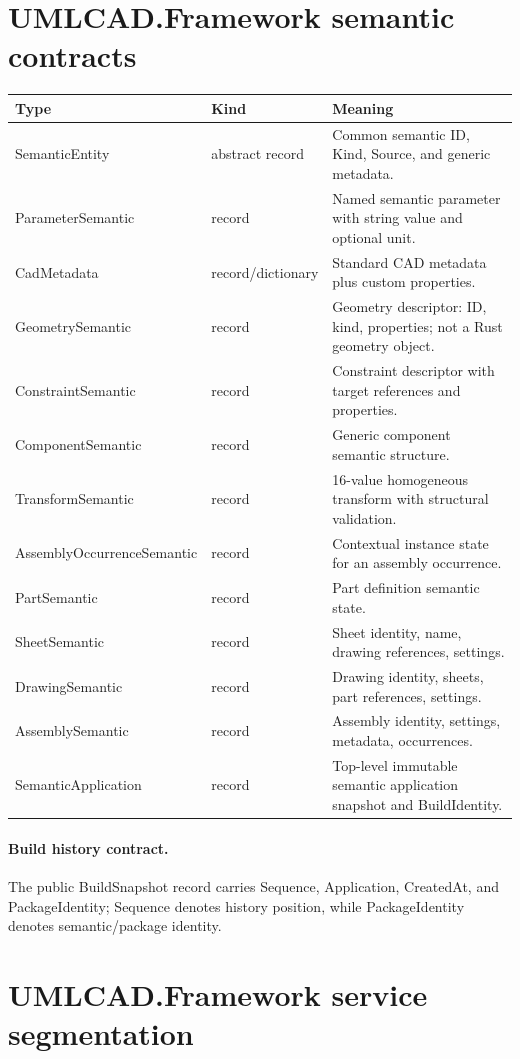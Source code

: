 \documentclass[11pt,a4paper]{report}
\begin{document}
\section{UMLCAD.Framework semantic contracts}

\begin{longtable}{@{}p{}p{}p{}@{}}
\toprule
Type & Kind & Meaning \\
\midrule
SemanticEntity & abstract record & Common semantic ID, Kind, Source, and generic metadata. \\
ParameterSemantic & record & Named semantic parameter with string value and optional unit. \\
CadMetadata & record/dictionary & Standard CAD metadata plus custom properties. \\
GeometrySemantic & record & Geometry descriptor: ID, kind, properties; not a Rust geometry object. \\
ConstraintSemantic & record & Constraint descriptor with target references and properties. \\
ComponentSemantic & record & Generic component semantic structure. \\
TransformSemantic & record & 16-value homogeneous transform with structural validation. \\
AssemblyOccurrenceSemantic & record & Contextual instance state for an assembly occurrence. \\
PartSemantic & record & Part definition semantic state. \\
SheetSemantic & record & Sheet identity, name, drawing references, settings. \\
DrawingSemantic & record & Drawing identity, sheets, part references, settings. \\
AssemblySemantic & record & Assembly identity, settings, metadata, occurrences. \\
SemanticApplication & record & Top-level immutable semantic application snapshot and BuildIdentity. \\
\bottomrule
\end{longtable}

\paragraph{Build history contract.} The public BuildSnapshot record carries Sequence, Application, CreatedAt, and PackageIdentity; Sequence denotes history position, while PackageIdentity denotes semantic/package identity.\n\n\section{UMLCAD.Framework service segmentation}
\end{document}

